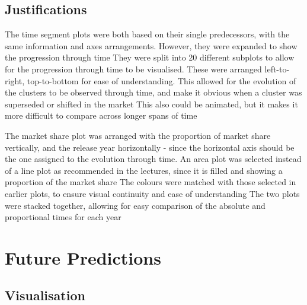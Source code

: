 \documentclass[conference]{IEEEtran}
\begin{document}
\subsection{Justifications}

The time segment plots were both based on their single predecessors, with the same information and axes arrangements. However, they were expanded to show the progression through time
They were split into 20 different subplots to allow for the progression through time to be visualised. These were arranged left-to-right, top-to-bottom for ease of understanding. 
This allowed for the evolution of the clusters to be observed through time, and make it obvious when a cluster was superseded or shifted in the market
This also could be animated, but it makes it more difficult to compare across longer spans of time

The market share plot was arranged with the proportion of market share vertically, and the release year horizontally - since the horizontal axis should be the one assigned to the evolution through time. An area plot was selected instead of a line plot as recommended in the lectures, since it is filled and showing a proportion of the market share
The colours were matched with those selected in earlier plots, to ensure visual continuity and ease of understanding
The two plots were stacked together, allowing for easy comparison of the absolute and proportional times for each year

\section{Future Predictions}

\subsection{Visualisation}
\end{document}
